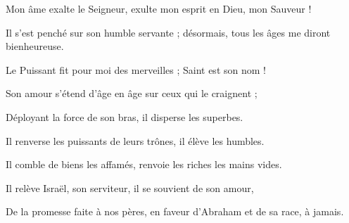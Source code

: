 \item Mon âme exalte le Seigneur,
exulte mon esprit en Dieu, mon Sauveur !

\item  Il s'est penché sur son humble servante ;
désormais, tous les âges me diront bienheureuse.

\item Le Puissant fit pour moi des merveilles ;
Saint est son nom !

\item Son amour s'étend d'âge en âge
sur ceux qui le craignent ;

\item Déployant la force de son bras,
il disperse les superbes.

\item Il renverse les puissants de leurs trônes,
il élève les humbles.

\item Il comble de biens les affamés,
renvoie les riches les mains vides.

\item Il relève Israël, son serviteur,
il se souvient de son amour,

\item De la promesse faite à nos pères,
en faveur d'Abraham et de sa race, à jamais.
